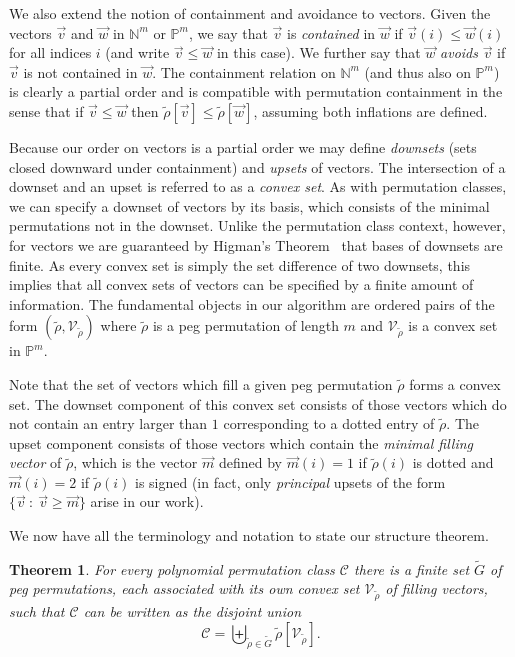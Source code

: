 \documentclass[10pt]{article}
\theoremstyle{plain}
\newtheorem{theorem}{Theorem}[section]
\theoremstyle{definition}
\newcommand{\C}{\mathcal{C}}
\newcommand{\st}{\::\:}
\begin{document}
We also extend the notion of containment and avoidance to vectors. Given the vectors $\vec{v}$ and $\vec{w}$ in $\mathbb{N}^m$ or $\mathbb{P}^m$, we say that $\vec{v}$ is \emph{contained} in $\vec{w}$ if $\vec{v}(i)\le\vec{w}(i)$ for all indices $i$ (and write $\vec{v}\le\vec{w}$ in this case). We further say that $\vec{w}$ \emph{avoids} $\vec{v}$ if $\vec{v}$ is not contained in $\vec{w}$. The containment relation on $\mathbb{N}^m$ (and thus also on $\mathbb{P}^m$) is clearly a partial order and is compatible with permutation containment in the sense that if $\vec{v}\le\vec{w}$ then $\tilde{\rho}[\vec{v}]\le\tilde{\rho}[\vec{w}]$, assuming both inflations are defined. 

Because our order on vectors is a partial order we may define \emph{downsets} (sets closed downward under containment) and \emph{upsets} of vectors. The intersection of a downset and an upset is referred to as a \emph{convex set}. As with permutation classes, we can specify a downset of vectors by its basis, which consists of the minimal permutations not in the downset. Unlike the permutation class context, however, for vectors we are guaranteed by Higman's Theorem~\cite{higman:ordering-by-div:} that bases of downsets are finite. As every convex set is simply the set difference of two downsets, this implies that all convex sets of vectors can be specified by a finite amount of information. The fundamental objects in our algorithm are ordered pairs of the form $(\tilde{\rho}, \mathcal{V}_{\tilde{\rho}})$ where $\tilde{\rho}$ is a peg permutation of length $m$ and $\mathcal{V}_{\tilde{\rho}}$ is a convex set in $\mathbb{P}^m$.

Note that the set of vectors which fill a given peg permutation $\tilde{\rho}$ forms a convex set. The downset component of this convex set consists of those vectors which do not contain an entry larger than $1$ corresponding to a dotted entry of $\tilde{\rho}$. The upset component consists of those vectors which contain the \emph{minimal filling vector} of $\tilde{\rho}$, which is the vector $\vec{m}$ defined by $\vec{m}(i)=1$ if $\tilde{\rho}(i)$ is dotted and $\vec{m}(i)=2$ if $\tilde{\rho}(i)$ is signed (in fact, only \emph{principal} upsets of the form $\{\vec{v}\st \vec{v}\ge\vec{m}\}$ arise in our work).

We now have all the terminology and notation to state our structure theorem.

\begin{theorem}
\label{thm-polynomial-main}
For every polynomial permutation class $\C$ there is a finite set $\tilde{G}$ of peg permutations, each associated with its own convex set $\mathcal{V}_{\tilde{\rho}}$ of filling vectors, such that $\C$ can be written as the disjoint union
\[
	\C=\biguplus_{\tilde{\rho}\in\tilde{G}} \tilde{\rho}[\mathcal{V}_{\tilde{\rho}}].
\]	
\end{theorem}
\end{document}
